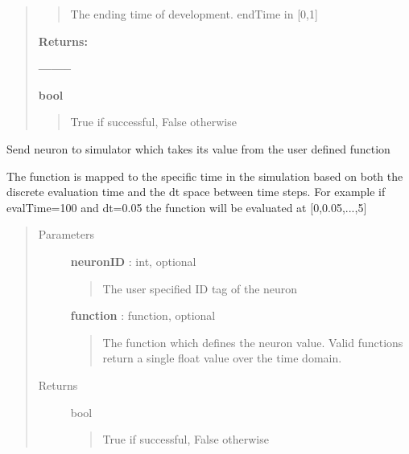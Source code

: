 \documentclass[letterpaper,10pt,english]{sphinxmanual}
\begin{document}
\begin{fulllineitems}
\begin{fulllineitems}
\begin{quote}
\begin{description}
\begin{quote}
The ending time of development. endTime in {[}0,1{]}
\end{quote}

\textbf{Returns:}

\textbf{--------}

\textbf{bool}
\begin{quote}

True if successful, False otherwise
\end{quote}

\end{description}\end{quote}

\end{fulllineitems}


\begin{fulllineitems}
\label{code:pyrosim.PYROSIM.Send_Function_Neuron}
Send neuron to simulator which takes its value from the user defined function

The function is mapped to the specific time in the simulation based on both 
the discrete evaluation time and the dt space between time steps. For example
if evalTime=100 and dt=0.05 the function will be evaluated at {[}0,0.05,...,5{]}
\begin{quote}\begin{description}
\item[{Parameters}] \leavevmode
\textbf{neuronID} : int, optional
\begin{quote}

The user specified ID tag of the neuron
\end{quote}

\textbf{function} : function, optional
\begin{quote}

The function which defines the neuron value. Valid functions return
a single float value over the time domain.
\end{quote}

\item[{Returns}] \leavevmode
bool
\begin{quote}

True if successful, False otherwise
\end{quote}

\end{description}\end{quote}


\end{fulllineitems}
\end{fulllineitems}
\end{document}
